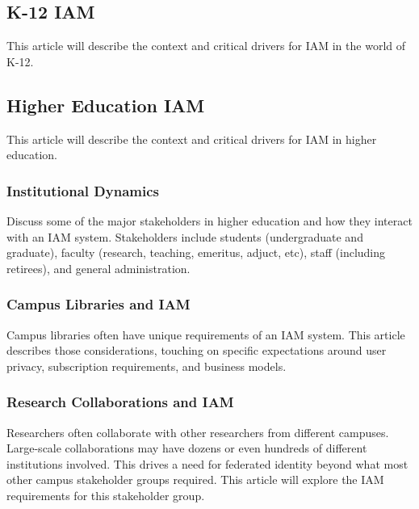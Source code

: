 \hypertarget{k-12-iam}{%
\subsection{K-12 IAM}\label{k-12-iam}}

This article will describe the context and critical drivers for IAM in
the world of K-12.

\hypertarget{higher-education-iam}{%
\subsection{Higher Education IAM}\label{higher-education-iam}}

This article will describe the context and critical drivers for IAM in
higher education.

\hypertarget{institutional-dynamics}{%
\subsubsection{Institutional Dynamics}\label{institutional-dynamics}}

Discuss some of the major stakeholders in higher education and how they
interact with an IAM system. Stakeholders include students
(undergraduate and graduate), faculty (research, teaching, emeritus,
adjuct, etc), staff (including retirees), and general administration.

\hypertarget{campus-libraries-and-iam}{%
\subsubsection{Campus Libraries and IAM}\label{campus-libraries-and-iam}}

Campus libraries often have unique requirements of an IAM system. This
article describes those considerations, touching on specific
expectations around user privacy, subscription requirements, and
business models.

\hypertarget{research-collaborations-and-iam}{%
\subsubsection{Research Collaborations and
IAM}\label{research-collaborations-and-iam}}

Researchers often collaborate with other researchers from different
campuses. Large-scale collaborations may have dozens or even hundreds of
different institutions involved. This drives a need for federated
identity beyond what most other campus stakeholder groups required. This
article will explore the IAM requirements for this stakeholder group.

